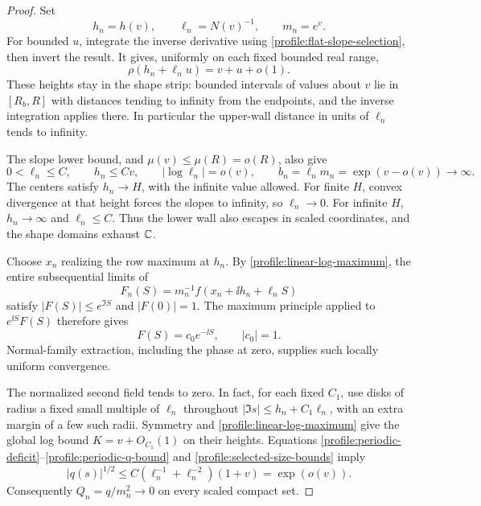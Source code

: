 \begin{proof}
Set
\begin{equation}
 \label{profile:selected-scales}
 h_n=h(v),\qquad \ell_n=N(v)^{-1},\qquad m_n=e^v.
\end{equation}
For bounded \(u\), integrate the inverse derivative using
\eqref{profile:flat-slope-selection}, then invert the result. It
gives, uniformly on each fixed bounded real range,
\begin{equation}
 \label{profile:linear-log-maximum}
 \rho(h_n+\ell_nu)=v+u+o(1).
\end{equation}
These heights stay in the shape strip: bounded intervals of values
about \(v\) lie in \([R_b,R]\) with distances tending to infinity
from the endpoints, and the inverse integration applies there.
In particular the upper-wall distance in units of \(\ell_n\)
tends to infinity.

The slope lower bound, and \(\mu(v)\le\mu(R)=o(R)\), also give
\begin{equation}
 \label{profile:selected-size-bounds}
 0<\ell_n\le C,\qquad h_n\le Cv,
 \qquad |\log\ell_n|=o(v),\qquad
 b_n=\ell_nm_n=\exp(v-o(v))\longrightarrow\infty.
\end{equation}
The centers satisfy \(h_n\to H\), with the infinite value
allowed. For finite \(H\), convex divergence at that height forces
the slopes to infinity, so \(\ell_n\to0\). For infinite \(H\),
\(h_n\to\infty\) and \(\ell_n\le C\). Thus the lower wall also
escapes in scaled coordinates, and the shape domains exhaust
\(\mathbb C\).

Choose \(x_n\) realizing the row maximum at \(h_n\). By
\eqref{profile:linear-log-maximum}, the entire subsequential limits
of
\[
 F_n(S)=m_n^{-1}f(x_n+\ii h_n+\ell_nS)
\]
satisfy \(|F(S)|\le e^{\Im S}\) and \(|F(0)|=1\). The maximum
principle applied to \(e^{\ii S}F(S)\) therefore gives
\begin{equation}
 \label{profile:selected-exponential}
 F(S)=c_0e^{-\ii S},\qquad |c_0|=1.
\end{equation}
Normal-family extraction, including the phase at zero, supplies
such locally uniform convergence.

The normalized second field tends to zero. In fact, for each fixed
\(C_1\), use disks of radius a fixed small multiple of \(\ell_n\)
throughout \(|\Im s|\le h_n+C_1\ell_n\), with an extra margin
of a few such radii. Symmetry and
\eqref{profile:linear-log-maximum} give the global log bound
\(K=v+O_{C_1}(1)\) on their heights. Equations
\eqref{profile:periodic-deficit}--\eqref{profile:periodic-q-bound}
and \eqref{profile:selected-size-bounds} imply
\begin{equation}
 \label{profile:selected-q-smallness}
 |q(s)|^{1/2}\le
 C(\ell_n^{-1}+\ell_n^{-2})(1+v)=\exp(o(v)).
\end{equation}
Consequently \(Q_n=q/m_n^2\to0\) on every scaled compact set.


\end{proof}

